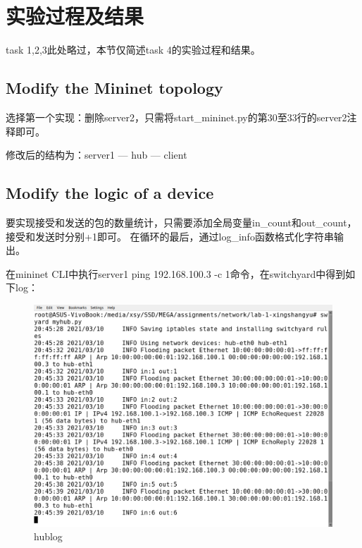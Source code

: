 \documentclass[12pt,a4paper,UTF8]{article}
\begin{document}
\section{实验过程及结果}
task 1,2,3此处略过，本节仅简述task 4的实验过程和结果。

\subsection{Modify the Mininet topology}
选择第一个实现：删除server2，只需将start\_mininet.py的第30至33行的server2注释即可。

修改后的结构为：server1 --- hub --- client

\subsection{Modify the logic of a device}
要实现接受和发送的包的数量统计，只需要添加全局变量in\_count和out\_count，接受和发送时分别+1即可。
在循环的最后，通过log\_info函数格式化字符串输出。

在mininet CLI中执行server1 ping 192.168.100.3 -c 1命令，在switchyard中得到如下log：
\begin{figure}[htbp]
	\centering
	\includegraphics[width=\textwidth]{hublog}
	\caption{hublog}
\end{figure}

\newpage
\end{document}
